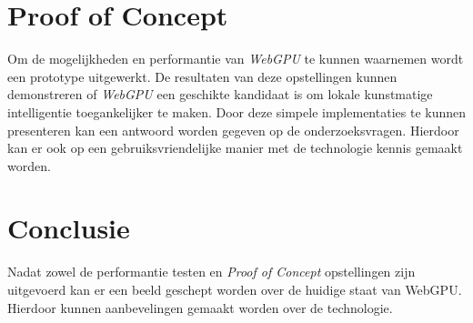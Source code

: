 \section{Proof of Concept}

Om de mogelijkheden en performantie van \textit{WebGPU} te kunnen waarnemen wordt een prototype uitgewerkt. De resultaten van deze opstellingen kunnen demonstreren of \textit{WebGPU} een geschikte kandidaat is om lokale kunstmatige intelligentie toegankelijker te maken. Door deze simpele implementaties te kunnen presenteren  kan een antwoord worden gegeven op de onderzoeksvragen. Hierdoor kan er ook op een gebruiksvriendelijke manier met de technologie kennis gemaakt worden.

\section{Conclusie}

Nadat zowel de performantie testen en \textit{Proof of Concept} opstellingen zijn uitgevoerd kan er een beeld geschept worden over de huidige staat van WebGPU. Hierdoor kunnen aanbevelingen gemaakt worden over de technologie.
